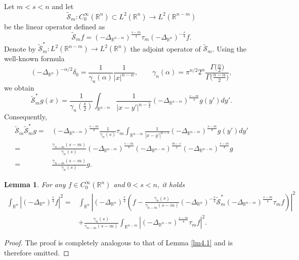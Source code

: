 \documentclass[12pt,reqno]{amsart}%
\theoremstyle{plain}
\newtheorem{lemma}{Lemma}[section]
\numberwithin{equation}{section}
\begin{document}
Let $m < s < n$ and let
\[
\widetilde{\mathcal{S}}_{m}: C_{0}^{\infty}(\mathbb{R}^n)\subset L^2(\mathbb{R}^{n})\longrightarrow L^2(\mathbb{R}^{n-m})
\]
be the linear operator defined as
\[
\widetilde{\mathcal{S}}_{m}f = (-\Delta_{\mathbb{R}^{n-m}})^{\frac{s-m}{4}}
\tau_{m}(-\Delta_{\mathbb{R}^{n}})^{-\frac{s}{4}}f .
\]
Denote by \(\widetilde{\mathcal{S}}^{\ast}_{m}: L^2(\mathbb{R}^{n-m})\to L^2(\mathbb{R}^{n})\) the adjoint operator  of \(\widetilde{\mathcal{S}}_{m}\).
Using the well-known formula
\[
(-\Delta_{\mathbb{R}^n})^{-\alpha/2} \delta_{0}= \frac{1}{\gamma_{n}(\alpha)}
\frac{1}{|x|^{n-\alpha}}, \qquad
\gamma_{n}(\alpha) = \pi^{n/2}2^{\alpha}
\frac{\Gamma\bigl(\frac{\alpha}{2}\bigr)}{\Gamma\bigl(\frac{n-\alpha}{2}\bigr)},
\]
we obtain
\[
\widetilde{\mathcal{S}}^{\ast}_{m}g(x) = \frac{1}{\gamma_{n}(\frac{s}{2})}
\int_{\mathbb{R}^{n-m}} \frac{1}{|x-y'|^{n-\frac{s}{2}}}
(-\Delta_{\mathbb{R}^{n-m}})^{\frac{s-m}{4}}g(y')dy'.
\]
Consequently,
\begin{align}\nonumber
\widetilde{\mathcal{S}}_{m}\widetilde{\mathcal{S}}_{m}^{\ast}g
=& (-\Delta_{\mathbb{R}^{n-m}})^{\frac{s-m}{4}}
\frac{1}{\gamma_{n}(s)}\tau_{m}
\int_{\mathbb{R}^{n-m}} \frac{1}{|x-y'|^{n-s}}
(-\Delta_{\mathbb{R}^{n-m}})^{\frac{s-m}{4}}g(y')dy' \\
\nonumber
=& \frac{\gamma_{n-m}(s-m)}{\gamma_{n}(s)} (-\Delta_{\mathbb{R}^{n-m}})^{\frac{s-m}{4}}(-\Delta_{\mathbb{R}^{n-m}})^{\frac{m-s}{2}}
(-\Delta_{\mathbb{R}^{n-m}})^{\frac{s-m}{4}} g\\
\label{5.1}
=&\frac{\gamma_{n-m}(s-m)}{\gamma_{n}(s)}g.
\end{align}


\begin{lemma}\label{lm5.1}
For any $f\in C_{0}^{\infty}(\mathbb{R}^{n})$ and $0<s< n$, it holds
\begin{align*}
\int_{\mathbb{R}^{n}}|(-\Delta_{\mathbb{R}^{n}})^{\frac{s}{4}}f|^{2}=&\int_{\mathbb{R}^{n}}\left|(-\Delta_{\mathbb{R}^{n}})^{\frac{s}{4}}(f-
\frac{\gamma_{n}(s)}{\gamma_{n-m}(s-m)}(-\Delta_{\mathbb{R}^{n}})^{-\frac{s}{4}}\widetilde{\mathcal{S}}_m^{\ast}(-\Delta_{\mathbb{R}^{n-m}})^{\frac{s-m}{4}} \tau_{m}f)\right|^{2}\\
&+
\frac{\gamma_{n}(s)}{\gamma_{n-m}(s-m)}
\int_{\mathbb{R}^{n-m}}|(-\Delta_{\mathbb{R}^{n-m}})^{\frac{s-m}{4}}\tau_{m}f|^{2}.
\end{align*}
\end{lemma}
\begin{proof}
The proof is completely analogous to that of Lemma \ref{lm4.1} and is therefore omitted.
\end{proof}
\end{document}
